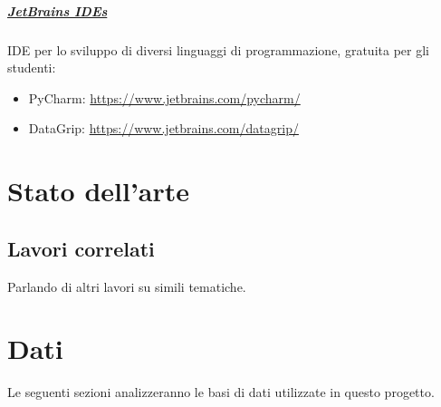 \documentclass[%
    corpo=12pt,
    twoside,
    oldstyle,
    autoretitolo,
    greek,
    evenboxes,
]{toptesi}
\begin{document}
\paragraph{\href{https://www.jetbrains.com/}{JetBrains IDEs}} IDE per lo sviluppo di diversi linguaggi di programmazione, gratuita per gli studenti:
\begin{itemize}
  \item PyCharm: \url{https://www.jetbrains.com/pycharm/}
  \item DataGrip: \url{https://www.jetbrains.com/datagrip/}
\end{itemize}

\chapter{Stato dell'arte}
\section{Lavori correlati}
Parlando di altri lavori su simili tematiche.


\chapter{Dati}
\label{chap:dataset}
Le seguenti sezioni analizzeranno le basi di dati utilizzate in questo progetto.
\end{document}
